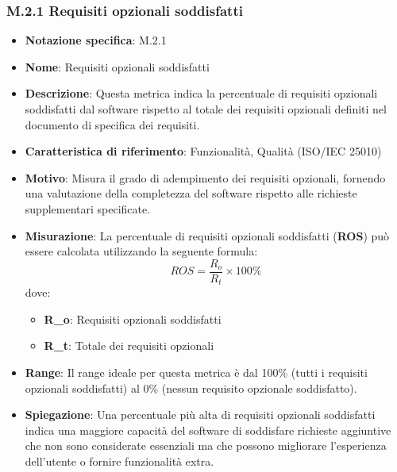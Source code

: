 \subsubsection{M.2.1 Requisiti opzionali soddisfatti}
\begin{itemize}
    \item \textbf{Notazione specifica}: M.2.1
    \item \textbf{Nome}: Requisiti opzionali soddisfatti
    \item \textbf{Descrizione}: Questa metrica indica la percentuale di requisiti opzionali soddisfatti dal software rispetto al totale dei requisiti opzionali definiti nel documento di specifica dei requisiti.
    \item \textbf{Caratteristica di riferimento}: Funzionalità, Qualità (ISO/IEC 25010)
    \item \textbf{Motivo}: Misura il grado di adempimento dei requisiti opzionali, fornendo una valutazione della completezza del software rispetto alle richieste supplementari specificate.
    \item \textbf{Misurazione}: La percentuale di requisiti opzionali soddisfatti (\textbf{ROS}) può essere calcolata utilizzando la seguente formula:
    \[ ROS = \frac{R_o}{R_t} \times 100\% \]
    dove:
    \begin{itemize}
        \item \textbf{R_o}: Requisiti opzionali soddisfatti
        \item \textbf{R_t}: Totale dei requisiti opzionali
    \end{itemize}
    \item \textbf{Range}: Il range ideale per questa metrica è dal 100\% (tutti i requisiti opzionali soddisfatti) al 0\% (nessun requisito opzionale soddisfatto).
    \item \textbf{Spiegazione}: Una percentuale più alta di requisiti opzionali soddisfatti indica una maggiore capacità del software di soddisfare richieste aggiuntive che non sono considerate essenziali ma che possono migliorare l'esperienza dell'utente o fornire funzionalità extra.
\end{itemize}
